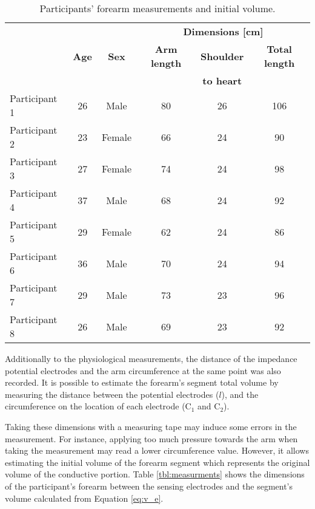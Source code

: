 \begin{table}[!htbp] %
	\caption{Participants' forearm measurements and initial volume.}
	\label{tbl:physiological}
	\centering
	\begin{tabular}{lcc|ccc}
		\toprule
		&              &              &         \multicolumn{3}{c}{\textbf{Dimensions [\si{\cm}]}}         \\
		& \textbf{Age} & \textbf{Sex} & \textbf{Arm length} & \textbf{Shoulder} & \textbf{Total length} \\
		&              &              &                     &  \textbf{to heart}   &                       \\ \midrule
		Participant 1 &      26      &     Male     &         80          &          26          &          106          \\
		Participant 2 &      23      &    Female    &         66          &          24          &          90           \\
		Participant 3 &      27      &    Female    &         74          &          24          &          98           \\
		Participant 4 &      37      &     Male     &         68          &          24          &          92           \\
		Participant 5 &      29      &    Female    &         62          &          24          &          86           \\
		Participant 6 &      36      &     Male     &         70          &          24          &          94           \\
		Participant 7 &      29      &     Male     &         73          &          23          &          96           \\
		Participant 8 &      26      &     Male     &         69          &          23          &          92           \\ \bottomrule
	\end{tabular}
\end{table}

Additionally to the physiological measurements, the distance of the impedance potential electrodes and the arm circumference at the same point was also recorded. It is possible to estimate the forearm's segment total volume by measuring the distance between the potential electrodes ($l$), and the circumference on the location of each electrode (C$_1$ and C$_2$).  

Taking these dimensions with a measuring tape may induce some errors in the measurement. For instance, applying too much pressure towards the arm when taking the measurement may read a lower circumference value.  However, it allows estimating the initial volume of the forearm segment which represents the original volume of the conductive portion. Table \ref{tbl:measurments} shows the dimensions of the participant's forearm between the sensing electrodes and the segment's volume calculated from Equation \ref{eq:v_e}.

